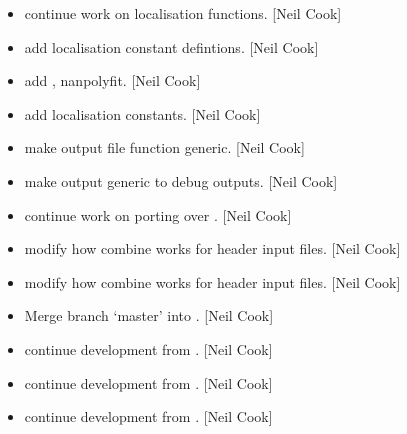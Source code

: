 \documentclass[a4paper,10pt,english]{report}
\begin{document}
\begin{itemize}
\item {} 
 \sphinxhyphen{} continue work on localisation
functions. {[}Neil Cook{]}

\item {} 
 \sphinxhyphen{} add localisation constant defintions. {[}Neil
Cook{]}

\item {} 
 \sphinxhyphen{} add , nanpolyfit. {[}Neil
Cook{]}

\item {} 
 \sphinxhyphen{} add localisation constants. {[}Neil
Cook{]}

\item {} 
 \sphinxhyphen{} make output file function generic. {[}Neil Cook{]}

\item {} 
 \sphinxhyphen{} make  output generic to debug outputs.
{[}Neil Cook{]}

\item {} 
 \sphinxhyphen{} continue work on porting over . {[}Neil Cook{]}

\item {} 
 \sphinxhyphen{} modify how combine works for header input files.
{[}Neil Cook{]}

\item {} 
 \sphinxhyphen{} modify how combine works for header input
files. {[}Neil Cook{]}

\item {} 
Merge branch ‘master’ into . {[}Neil Cook{]}

\item {} 
 \sphinxhyphen{} continue development from . {[}Neil Cook{]}

\item {} 
 \sphinxhyphen{} continue development from . {[}Neil Cook{]}

\item {} 
 \sphinxhyphen{} continue development from . {[}Neil Cook{]}


\end{itemize}
\end{document}
